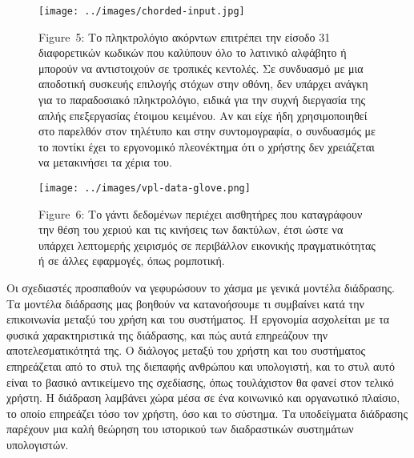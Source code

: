 \documentclass[
]{article}
\begin{document}
\leavevmode{}%
\begin{figure}
\hypertarget{fig:chorded-input}{%
\centering
\texttt{[image: ../images/chorded-input.jpg]}
\caption{Figure~5: Το πληκτρολόγιο ακόρντων επιτρέπει την είσοδο 31
διαφορετικών κωδικών που καλύπουν όλο το λατινικό αλφάβητο ή μπορούν να
αντιστοιχούν σε τροπικές κεντολές. Σε συνδυασμό με μια αποδοτική
συσκευής επιλογής στόχων στην οθόνη, δεν υπάρχει ανάγκη για το
παραδοσιακό πληκτρολόγιο, ειδικά για την συχνή διεργασία της απλής
επεξεργασίας έτοιμου κειμένου. Αν και είχε ήδη χρησιμοποιηθεί στο
παρελθόν στον τηλέτυπο και στην συντομογραφία, ο συνδυασμός με το
ποντίκι έχει το εργονομικό πλεονέκτημα ότι ο χρήστης δεν χρειάζεται να
μετακινήσει τα χέρια του.}\label{fig:chorded-input}
}
\end{figure}

\leavevmode{}%
\begin{figure}
\hypertarget{fig:vpl-data-glove}{%
\centering
\texttt{[image: ../images/vpl-data-glove.png]}
\caption{Figure~6: Το γάντι δεδομένων περιέχει αισθητήρες που
καταγράφουν την θέση του χεριού και τις κινήσεις των δακτύλων, έτσι ώστε
να υπάρχει λεπτομερής χειρισμός σε περιβάλλον εικονικής πραγματικότητας
ή σε άλλες εφαρμογές, όπως ρομποτική.}\label{fig:vpl-data-glove}
}
\end{figure}

Οι σχεδιαστές προσπαθούν να γεφυρώσουν το χάσμα με γενικά μοντέλα
διάδρασης. Τα μοντέλα διάδρασης μας βοηθούν να κατανοήσουμε τι συμβαίνει
κατά την επικοινωνία μεταξύ του χρήση και του συστήματος. Η εργονομία
ασχολείται με τα φυσικά χαρακτηριστικά της διάδρασης, και πώς αυτά
επηρεάζουν την αποτελεσματικότητά της. Ο διάλογος μεταξύ του χρήστη και
του συστήματος επηρεάζεται από το στυλ της διεπαφής ανθρώπου και
υπολογιστή, και το στυλ αυτό είναι το βασικό αντικείμενο της σχεδίασης,
όπως τουλάχιστον θα φανεί στον τελικό χρήστη. Η διάδραση λαμβάνει χώρα
μέσα σε ένα κοινωνικό και οργανωτικό πλαίσιο, το οποίο επηρεάζει τόσο
τον χρήστη, όσο και το σύστημα. Τα υποδείγματα διάδρασης παρέχουν μια
καλή θεώρηση του ιστορικού των διαδραστικών συστημάτων υπολογιστών.
\end{document}
